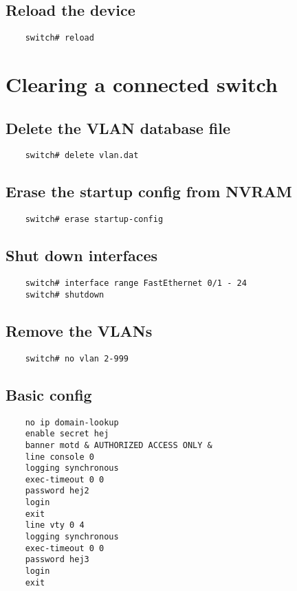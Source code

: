 \documentclass{article}
\begin{document}
\subsection{Reload the device}
\begin{verbatim}
	switch# reload
\end{verbatim}

\section{Clearing a connected switch}
\subsection{Delete the VLAN database file}
\begin{verbatim}
	switch# delete vlan.dat
\end{verbatim}

\subsection{Erase the startup config from NVRAM}
\begin{verbatim}
	switch# erase startup-config
\end{verbatim}

\subsection{Shut down interfaces}
\begin{verbatim}
	switch# interface range FastEthernet 0/1 - 24
	switch# shutdown
\end{verbatim}

\subsection{Remove the VLANs}
\begin{verbatim}
	switch# no vlan 2-999
\end{verbatim}

\subsection{Basic config}
\begin{verbatim}
	no ip domain-lookup
	enable secret hej
	banner motd & AUTHORIZED ACCESS ONLY &
	line console 0
	logging synchronous
	exec-timeout 0 0
	password hej2
	login
	exit
	line vty 0 4
	logging synchronous
	exec-timeout 0 0
	password hej3
	login
	exit
\end{verbatim}
\end{document}
